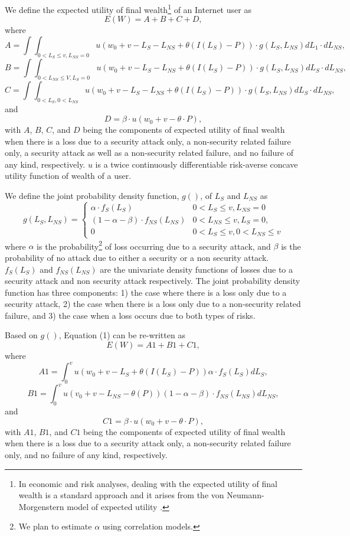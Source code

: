\documentclass[letterpaper,12pt, onecolumn, nodraft]{IEEEtran}
\begin{document}
We define the expected utility of final wealth\footnote{In economic and risk analyses, dealing with the expected utility of final wealth is a standard approach and it arises from the von Neumann-Morgenstern model of expected utility \cite{nmr}.}  of an Internet user as
\begin{equation}
E(W) = A + B + C + D,
\end{equation}
where
\[A = \int\int_{0 < L_{S} \le v, L_{NS} = 0} u(w_{0} + v - L_{S} - L_{NS} + \theta(I(L_{S}) - P))\cdot g(L_{S}, L_{NS})dL_{1}\cdot d{L_{NS}},\]
\[B = \int\int_{0 < L_{NS} \le V, L_{S} = 0} u(w_{0} + v - L_{S} - L_{NS} + \theta(I(L_{S}) - P))\cdot g(L_{S}, L_{NS})dL_{S}\cdot d{L_{NS}},\]
\[C = \int\int_{0 < L_{S}, 0 < L_{NS}} u(w_{0} + v - L_{S} - L_{NS} + \theta(I(L_{S}) - P))\cdot g(L_{S}, L_{NS})dL_{S}\cdot d{L_{NS}},\]
and
\[D = \beta\cdot u(w_{0} + v - \theta\cdot P),\]
with $A$, $B$, $C$, and $D$ being the components of expected utility of final wealth when there is a loss due to a security attack only, a non-security related failure only, a security attack as well as a non-security related failure, and no failure of any kind, respectively. $u$ is a twice continuously differentiable risk-averse concave utility function of wealth of a user. 

We define the joint probability density function, $g()$, of $L_{S}$ and $L_{NS}$ as
\begin{equation}
g(L_{S},L_{NS}) = \left\{
\begin{array}{rl}
\alpha\cdot f_{S}(L_{S}) & 0 < L_{S}\le v, L_{NS} = 0\\
(1 - \alpha - \beta)\cdot f_{NS}(L_{NS}) & 0 < L_{NS}\le v, L_{S} = 0,\\
0 & 0 < L_{S}\le v, 0 < L_{NS}\le v
\end{array}\right.
\end{equation}
where $\alpha$ is the probability\footnote{We plan to estimate $\alpha$ using correlation models.}  of loss occurring due to a security attack, and $\beta$ is the probability of no attack due to either a security or a non security attack. $f_{S}(L_{S})$ and $f_{NS}(L_{NS})$ are the univariate density functions of losses due to a security attack and non security attack respectively. The joint probability density function has three components: 1) the case where there is a loss only due to a security attack, 2) the case when there is a loss only due to a non-security related failure, and 3) the case when a loss occurs due to both types of risks.

Based on $g()$, Equation (1) can be re-written as
\begin{equation}
E(W) = A1 + B1 + C1,
\end{equation}
where
\[A1 = \int_{0}^{v}u(w_{0} + v - L_{S} + \theta(I(L_{S}) - P))\alpha\cdot f_{S}(L_{S})dL_{S},\]
\[B1 = \int_{0}^{v}u(v_{0} + v - L_{NS} - \theta(P))(1 - \alpha - \beta)\cdot f_{NS}(L_{NS})dL_{NS},\]
and
\[C1 = \beta\cdot u(w_{0} + v - \theta\cdot P),\]
with $A1$, $B1$, and $C1$ being the components of expected utility of final wealth when there is a loss due to a security attack only, a non-security related failure only, and no failure of any kind, respectively. 
\end{document}
